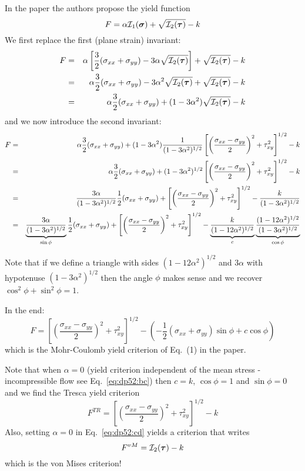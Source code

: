In the paper the authors propose the yield function 
\[
F = \alpha {\cal I}_1(\bm\sigma) + \sqrt{{\cal I}_2(\bm\tau)} - k
\]
We first replace the first (plane strain) invariant:
\begin{eqnarray}
F 
&=& \alpha \left[ \frac32(\sigma_{xx}+\sigma_{yy})- 3 \alpha \sqrt{{\cal I}_2(\bm\tau)} \right]
+ \sqrt{{\cal I}_2(\bm\tau)} - k \nonumber\\
&=&\alpha \frac32(\sigma_{xx}+\sigma_{yy})- 3 \alpha^2 \sqrt{{\cal I}_2(\bm\tau)}
+ \sqrt{{\cal I}_2(\bm\tau)} - k  \nonumber\\
&=&\alpha \frac32(\sigma_{xx}+\sigma_{yy}) +(1- 3 \alpha^2) \sqrt{{\cal I}_2(\bm\tau)} - k \nonumber
\end{eqnarray}
and we now introduce the second invariant:
\begin{eqnarray}
F &=& 
\alpha \frac32(\sigma_{xx}+\sigma_{yy}) +(1- 3 \alpha^2)
\frac{1}{(1 -3\alpha^2)^{1/2}} \left[\left(\frac{\sigma_{xx}-\sigma_{yy}}{2} \right)^2 
+ \tau_{xy}^2 \right]^{1/2} -  k  \nonumber\\
&=& \alpha \frac32(\sigma_{xx}+\sigma_{yy}) +(1- 3 \alpha^2)^{1/2}
\left[\left(\frac{\sigma_{xx}-\sigma_{yy}}{2} \right)^2 + \tau_{xy}^2 \right]^{1/2} 
- k  \nonumber\\
&=&\frac{3\alpha}{(1- 3 \alpha^2)^{1/2}}
\frac12(\sigma_{xx}+\sigma_{yy}) +
\left[\left(\frac{\sigma_{xx}-\sigma_{yy}}{2} \right)^2 + \tau_{xy}^2 \right]^{1/2} 
- \frac{k}{(1- 3 \alpha^2)^{1/2}} 
\nonumber\\
&=&\underbrace{\frac{3\alpha}{(1- 3 \alpha^2)^{1/2}}}_{\sin\phi}
\frac12(\sigma_{xx}+\sigma_{yy}) +
\left[\left(\frac{\sigma_{xx}-\sigma_{yy}}{2} \right)^2 + \tau_{xy}^2 \right]^{1/2} 
- \underbrace{\frac{k}{(1- 12 \alpha^2)^{1/2}}}_{c}
\underbrace{\frac{(1- 12 \alpha^2)^{1/2}}{(1- 3 \alpha^2)^{1/2}}}_{\cos\phi}
\end{eqnarray}


Note that if we define a triangle with sides $(1- 12 \alpha^2)^{1/2}$ and $3\alpha$
with hypotenuse $(1- 3 \alpha^2)^{1/2}$ then the angle $\phi$ makes sense and
we recover $\cos^2\phi+\sin^2\phi=1$.

In the end:
\[
F = 
\left[\left(\frac{\sigma_{xx}-\sigma_{yy}}{2} \right)^2 + \tau_{xy}^2 \right]^{1/2}
-\left(-\frac12(\sigma_{xx}+\sigma_{yy}) \sin \phi + c \cos \phi \right)
\]
which is the Mohr-Coulomb yield criterion of Eq.~(1) in the paper.


Note that when $\alpha=0$ (yield criterion independent of the mean stress - incompressible flow see Eq.~\eqref{eq:dp52:bc}) then $c=k$, $\cos\phi=1$ and $\sin\phi=0$ and we find 
the Tresca yield criterion
\[
F^{TR}=  \left[\left(\frac{\sigma_{xx}-\sigma_{yy}}{2} \right)^2 + \tau_{xy}^2 \right]^{1/2} - k
\]
Also, setting $\alpha=0$ in Eq.~\eqref{eq:dp52:cd} yields a criterion that writes
\[
F^{vM}={\cal I}_2(\bm\tau) - k
\]
which is the von Mises criterion! 












\newpage
